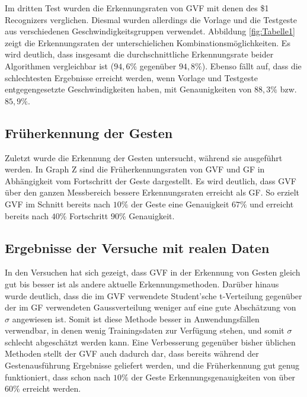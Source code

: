 \documentclass{llncs}
\begin{document}
Im dritten Test wurden die Erkennungsraten von GVF mit denen des \$1 Recognizers verglichen. Diesmal wurden allerdings die Vorlage und die Testgeste aus verschiedenen Geschwindigkeitsgruppen verwendet. Abbildung \ref{fig:Tabelle1} zeigt die Erkennungsraten der unterschielichen Kombinationsmöglichkeiten. Es wird deutlich, dass insgesamt die durchschnittliche Erkennungsrate beider Algorithmen vergleichbar ist ($94,6\%$ gegenüber $94,8\%$). Ebenso fällt auf, dass die schlechtesten Ergebnisse erreicht werden, wenn Vorlage und Testgeste  entgegengesetzte Geschwindigkeiten haben, mit Genaunigkeiten von $88,3\%$ bzw. $85,9\%$.

\subsection{Früherkennung der Gesten}
Zuletzt wurde die Erkennung der Gesten untersucht, während sie ausgeführt werden. In Graph Z sind die Früherkennungsraten von GVF und GF in Abhängigkeit vom Fortschritt der Geste dargestellt. Es wird deutlich, dass GVF über den ganzen Messbereich bessere Erkennungsraten erreicht als GF. So erzielt GVF im Schnitt bereits nach $10\%$ der Geste eine Genauigkeit $67\%$ und erreicht bereits nach $40\%$ Fortschritt $90\%$ Genauigkeit.

\subsection{Ergebnisse der Versuche mit realen Daten}
In den Versuchen hat sich gezeigt, dass GVF in der Erkennung von Gesten gleich gut bis besser ist als andere aktuelle Erkennungsmethoden. Darüber hinaus wurde deutlich, dass die im GVF verwendete Student'sche t-Verteilung gegenüber der im GF verwendeten Gaussverteilung weniger auf eine gute Abschätzung von $\sigma$ angewiesen ist. Somit ist diese Methode besser in Anwendungsfällen verwendbar, in denen wenig Trainingsdaten zur Verfügung stehen, und somit $\sigma$ schlecht abgeschätzt werden kann. Eine Verbesserung gegenüber bisher üblichen Methoden stellt der GVF auch dadurch dar, dass bereits während der Gestenausführung Ergebnisse geliefert werden, und die Früherkennung gut genug funktioniert, dass schon nach $10\%$ der Geste Erkennungsgenauigkeiten von über $60\%$ erreicht werden.
\end{document}
